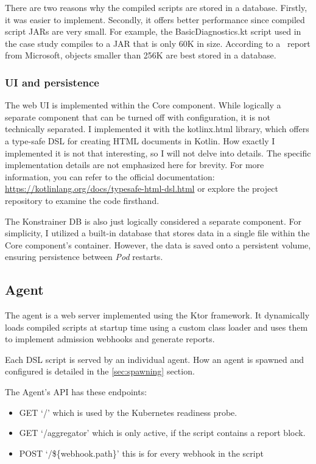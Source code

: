 There are two reasons why the compiled scripts are stored in a database. Firstly, it was easier to implement. Secondly, it offers better performance since compiled script JARs are very small. For example, the BasicDiagnostics.kt script used in the case study compiles to a JAR that is only 60K in size. According to a~\cite{DbSmall} report from Microsoft, objects smaller than 256K are best stored in a database.

\subsubsection{UI and persistence}

The web UI is implemented within the Core component. While logically a separate component that can be turned off with configuration, it is not technically separated. I implemented it with the kotlinx.html library, which offers a type-safe DSL for creating HTML documents in Kotlin. How exactly I implemented it is not that interesting, so I will not delve into details. The specific implementation details are not emphasized here for brevity. For more information, you can refer to the official documentation: \url{https://kotlinlang.org/docs/typesafe-html-dsl.html} or explore the project repository to examine the code firsthand.

The Konstrainer DB is also just logically considered a separate component. For simplicity, I utilized a built-in database that stores data in a single file within the Core component's container. However, the data is saved onto a persistent volume, ensuring persistence between \emph{Pod} restarts.

\subsection{Agent}

The agent is a web server implemented using the Ktor framework. It dynamically loads compiled scripts at startup time using a custom class loader and uses them to implement admission webhooks and generate reports.

Each DSL script is served by an individual agent. How an agent is spawned and configured is detailed in the \ref{sec:spawning} section.

The Agent's API has these endpoints:

\begin{itemize}
    \item GET `/' which is used by the Kubernetes readiness probe.
    \item GET `/aggregator' which is only active, if the script contains a report block.
    \item POST `/\$\{webhook.path\}' this is for every webhook in the script
\end{itemize}

